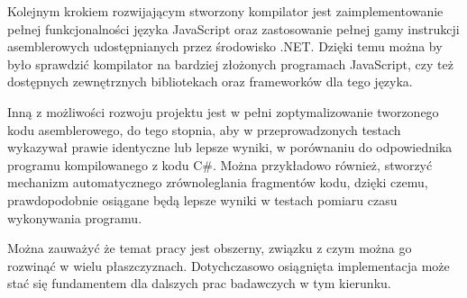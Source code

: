 \par Kolejnym krokiem rozwijającym stworzony kompilator jest zaimplementowanie pełnej funkcjonalności języka JavaScript oraz zastosowanie pełnej gamy instrukcji asemblerowych udostępnianych przez środowisko .NET. Dzięki temu można by było sprawdzić kompilator na bardziej złożonych programach JavaScript, czy też dostępnych zewnętrznych bibliotekach oraz frameworków dla tego języka.

\par Inną z możliwości rozwoju projektu jest w pełni zoptymalizowanie tworzonego kodu asemblerowego, do tego stopnia, aby w przeprowadzonych testach wykazywał prawie identyczne lub lepsze wyniki, w porównaniu do odpowiednika programu kompilowanego z kodu C\#. Można przykładowo również, stworzyć mechanizm automatycznego zrównoleglania fragmentów kodu, dzięki czemu, prawdopodobnie osiągane będą lepsze wyniki w testach pomiaru czasu wykonywania programu.

\par Można zauważyć że temat pracy jest obszerny, związku z czym można go rozwinąć w wielu płaszczyznach. Dotychczasowo osiągnięta implementacja może stać się fundamentem dla dalszych prac badawczych w tym kierunku.



